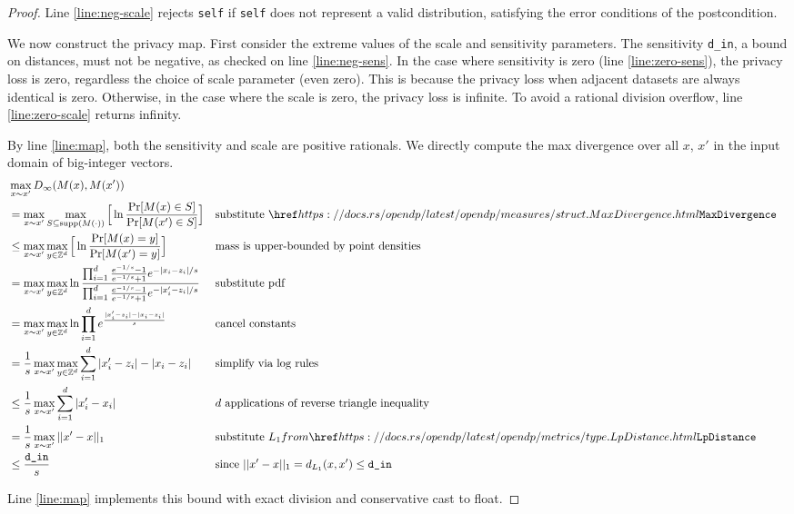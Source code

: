 \documentclass{article}
\begin{document}
\begin{proof}
    Line \ref{line:neg-scale} rejects \texttt{self} if \texttt{self} does not represent a valid distribution,
    satisfying the error conditions of the postcondition.

    We now construct the privacy map.
    First consider the extreme values of the scale and sensitivity parameters.
    The sensitivity \texttt{d\_in}, a bound on distances, must not be negative, as checked on line \ref{line:neg-sens}.
    In the case where sensitivity is zero (line \ref{line:zero-sens}), the privacy loss is zero, regardless the choice of scale parameter (even zero).
    This is because the privacy loss when adjacent datasets are always identical is zero.
    Otherwise, in the case where the scale is zero, the privacy loss is infinite.
    To avoid a rational division overflow, line \ref{line:zero-scale} returns infinity.

    By line \ref{line:map}, both the sensitivity and scale are positive rationals.
    We directly compute the max divergence over all $x$, $x'$ in the input domain of big-integer vectors.
    \begin{align}
        &\max_{x \sim x'} D_\infty(M(x), M(x')) \\
        &=\max_{x \sim x'} \max_{S \subseteq \textrm{supp}(M(\cdot))} \Big[\ln \dfrac{\Pr[M(x) \in S]}{\Pr[M(x') \in S]} \Big]
            &&\text{substitute } \rustdoc{measures/struct}{MaxDivergence} \\
        &\leq\max_{x \sim x'} \max_{y \in \mathbb{Z}^d} \Big[\ln \dfrac{\Pr[M(x) = y]}{\Pr[M(x') = y]} \Big] 
            &&\text{mass is upper-bounded by point densities}\\
        &=\max_{x \sim x'} \max_{y \in \mathbb{Z}^d} \ln \dfrac{\prod_{i=1}^d \frac{e^{-1/s} - 1}{e^{-1/s} + 1} e^{-|x_i - z_i|/s}}{\prod_{i=1}^d\frac{e^{-1/s} - 1}{e^{-1/s} + 1} e^{-|x'_i-z_i|/s}}
            &&\text{substitute pdf}\\
        &=\max_{x \sim x'} \max_{y \in \mathbb{Z}^d} \ln \prod_{i=1}^d e^{\frac{|x'_i - z_i| - |x_i - z_i|}{s}}
            &&\text{cancel constants} \\
        &=\frac{1}{s}\max_{x \sim x'} \max_{y \in \mathbb{Z}^d} \sum_{i=1}^d|x'_i - z_i| - |x_i - z_i| 
            &&\text{simplify via log rules}\\
        &\leq\frac{1}{s}\max_{x \sim x'} \sum_{i=1}^d|x'_i - x_i|
            &&d \text{ applications of reverse triangle inequality} \\
        &=\frac{1}{s}\max_{x \sim x'}||x' - x||_1
            &&\text{substitute } L_1 from \rustdoc{metrics/type}{LpDistance} \\
        &\leq\frac{\texttt{d\_in}}{s}
            &&\text{since } ||x' - x||_1 = d_{L_1}(x, x') \leq \texttt{d\_in} \\
    \end{align}

    Line \ref{line:map} implements this bound with exact division and conservative cast to float.
\end{proof}
\end{document}
